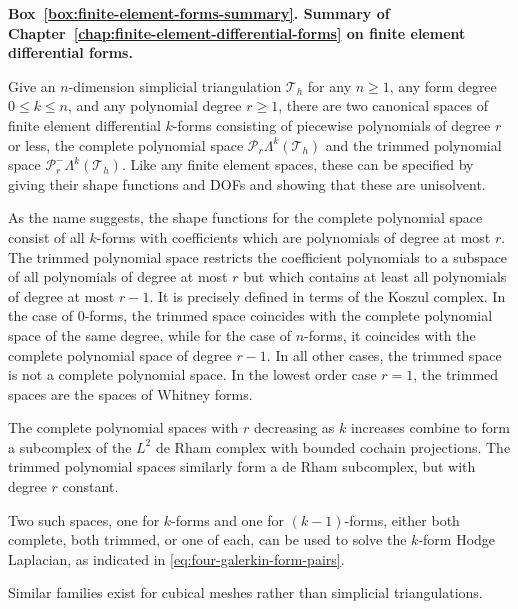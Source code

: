 \label{box:finite-element-forms-summary}
\begin{tcolorbox}[breakable,frame hidden,colback=KuangNei]
\textbf{Box~\ref{box:finite-element-forms-summary}. {Summary of Chapter~\ref{chap:finite-element-differential-forms} on finite element differential forms.}}

{Give an $n$-dimension simplicial triangulation $\mathcal T_h$ for any $n\geq1$, any form degree $0\leq k\leq n$, and any polynomial degree $r\geq1$, there are two canonical spaces of finite element differential $k$-forms consisting of piecewise polynomials of degree $r$ or less, the complete polynomial space $\mathcal P_r\Lambda^k(\mathcal T_h)$ and the trimmed polynomial space $\mathcal P_r^-\Lambda^k(\mathcal T_h)$. Like any finite element spaces, these can be specified by giving their shape functions and DOFs and showing that these are unisolvent.}

{As the name suggests, the shape functions for the complete polynomial space consist of all $k$-forms with coefficients which are polynomials of degree at most $r$. The trimmed polynomial space restricts the coefficient polynomials to a subspace of all polynomials of degree at most $r$ but which contains at least all polynomials of degree at most $r-1$. It is precisely defined in terms of the Koszul complex. In the case of 0-forms, the trimmed space coincides with the complete polynomial space of the same degree, while for the case of $n$-forms, it coincides with the complete polynomial space of degree $r-1$. In all other cases, the trimmed space is not a complete polynomial space. In the lowest order case $r=1$, the trimmed spaces are the spaces of Whitney forms.}

{The complete polynomial spaces with $r$ decreasing as $k$ increases combine to form a subcomplex of the $L^2$ de Rham complex with bounded cochain projections. The trimmed polynomial spaces similarly form a de Rham subcomplex, but with degree $r$ constant.}

{Two such spaces, one for $k$-forms and one for $(k-1)$-forms, either both complete, both trimmed, or one of each, can be used to solve the $k$-form Hodge Laplacian, as indicated in \eqref{eq:four-galerkin-form-pairs}.}

{Similar families exist for cubical meshes rather than simplicial triangulations.}
\end{tcolorbox}
\par\endgroup
